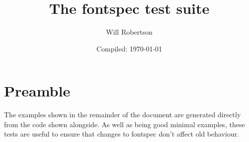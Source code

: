 \documentclass{article}
\begin{document}
\title{The \textsf{fontspec} test suite}
\author{Will Robertson}
\date{Compiled: \today}
\maketitle
\thispagestyle{empty}

\section*{Preamble}

The examples shown in the remainder of the document are generated directly from the code shown alongside.
As well as being good minimal examples, these tests are useful to ensure that changes to \textsf{fontspec} don't affect old behaviour.


\end{document}
